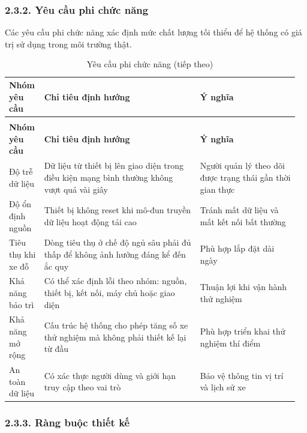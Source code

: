 \documentclass[a4paper]{extarticle}
\newcommand{\thesissettableid}[2]{%
  \renewcommand{\thetable}{#1}%
  \renewcommand{\theHtable}{#2}%
}
\begin{document}
\subsubsection{2.3.2. Yêu cầu phi chức năng}\label{yuxeau-cux1ea7u-phi-chux1ee9c-nux103ng}

Các yêu cầu phi chức năng xác định mức chất lượng tối thiểu để hệ thống có giá trị sử dụng trong môi trường thật.

{\thesissettableid{2.4}{condensed-bang-2-4-yeu-cau-phi-chuc-nang}
\def\LTcaptype{table}
\begin{longtable}{|L{0.104\linewidth}|L{0.522\linewidth}|L{0.332\linewidth}|}
\caption{Yêu cầu phi chức năng}\label{tab:condensed-bang-2-4-yeu-cau-phi-chuc-nang}\\
\hline
\textbf{Nhóm yêu cầu} & \textbf{Chỉ tiêu định hướng} & \textbf{Ý nghĩa} \\
\hline
\endfirsthead
\caption[]{Yêu cầu phi chức năng (tiếp theo)}\\
\hline
\textbf{Nhóm yêu cầu} & \textbf{Chỉ tiêu định hướng} & \textbf{Ý nghĩa} \\
\hline
\endhead
\endfoot
\endlastfoot
Độ trễ dữ liệu & Dữ liệu từ thiết bị lên giao diện trong điều kiện mạng bình thường không vượt quá vài giây & Người quản lý theo dõi được trạng thái gần thời gian thực \\\hline
Độ ổn định nguồn & Thiết bị không reset khi mô-đun truyền dữ liệu hoạt động tải cao & Tránh mất dữ liệu và mất kết nối bất thường \\\hline
Tiêu thụ khi xe đỗ & Dòng tiêu thụ ở chế độ ngủ sâu phải đủ thấp để không ảnh hưởng đáng kể đến ắc quy & Phù hợp lắp đặt dài ngày \\\hline
Khả năng bảo trì & Có thể xác định lỗi theo nhóm: nguồn, thiết bị, kết nối, máy chủ hoặc giao diện & Thuận lợi khi vận hành thử nghiệm \\\hline
Khả năng mở rộng & Cấu trúc hệ thống cho phép tăng số xe thử nghiệm mà không phải thiết kế lại từ đầu & Phù hợp triển khai thử nghiệm thí điểm \\\hline
An toàn dữ liệu & Có xác thực người dùng và giới hạn truy cập theo vai trò & Bảo vệ thông tin vị trí và lịch sử xe \\\hline
\end{longtable}
}

\subsubsection{2.3.3. Ràng buộc thiết kế}\label{ruxe0ng-buux1ed9c-thiux1ebft-kux1ebf}
\end{document}
